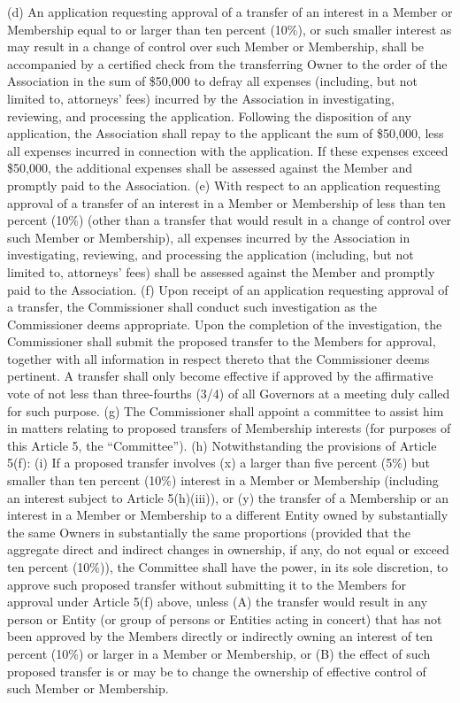 \documentclass[]{book}
\begin{document}
(d) An application requesting approval of a transfer of an interest in a Member or Membership equal to or larger than ten percent (10\%), or such smaller interest as may result in a change of control over such Member or Membership, shall be accompanied by a certified check from the transferring Owner to the order of the Association in the sum of \$50,000 to defray all expenses (including, but not limited to, attorneys' fees) incurred by the Association in investigating, reviewing, and processing the application. Following the disposition of any application, the Association shall repay to the applicant the sum of \$50,000, less all expenses incurred in connection with the application. If these expenses exceed \$50,000, the additional expenses shall be assessed against the Member and promptly paid to the Association.
(e) With respect to an application requesting approval of a transfer of an interest in a Member or Membership of less than ten percent (10\%) (other than a transfer that would result in a change of control over such Member or Membership), all expenses incurred by the Association in investigating, reviewing, and processing the application (including, but not limited to, attorneys' fees) shall be assessed against the Member and promptly paid to the Association.
(f) Upon receipt of an application requesting approval of a transfer, the Commissioner shall conduct such investigation as the Commissioner deems appropriate. Upon the completion of the investigation, the Commissioner shall submit the proposed transfer to the Members for approval, together with all information in respect thereto that the Commissioner deems pertinent. A transfer shall only become effective if approved by the affirmative vote of not less than three-fourths (3/4) of all Governors at a meeting duly called for such purpose.
(g) The Commissioner shall appoint a committee to assist him in matters relating to proposed transfers of Membership interests (for purposes of this Article 5, the ``Committee'').
(h) Notwithstanding the provisions of Article 5(f):
(i) If a proposed transfer involves (x) a larger than five percent (5\%) but smaller than ten percent (10\%) interest in a Member or Membership (including an interest subject to Article 5(h)(iii)), or (y) the transfer of a Membership or an interest in a Member or Membership to a different Entity owned by substantially the same Owners in substantially the same proportions (provided that the aggregate direct and indirect changes in ownership, if any, do not equal or exceed ten percent (10\%)), the Committee shall have the power, in its sole discretion, to approve such proposed transfer without submitting it to the Members for approval under Article 5(f) above, unless (A) the transfer would result in any person or Entity (or group of persons or Entities acting in concert) that has not been approved by the Members directly or indirectly owning an interest of ten percent (10\%) or larger in a Member or Membership, or (B) the effect of such proposed transfer is or may be to change the ownership of effective control of such Member or Membership.
\end{document}
